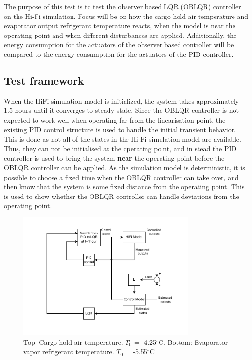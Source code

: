 The purpose of this test is to test the observer based LQR (OBLQR) controller on the Hi-Fi simulation. Focus will be on how the cargo hold air temperature and evaporator output refrigerant temperature reacts, when the model is near the operating point and when different disturbances are applied. Additionally, the energy consumption for the actuators of the observer based controller will be compared to the energy consumption for the actuators of the PID controller.

\subsection{Test framework}
When the HiFi simulation model is initialized, the system takes approximately 1.5 hours until it converges to steady state. Since the OBLQR controller is not expected to work well when operating far from the linearisation point, the existing PID control structure is used to handle the initial transient behavior. This is done as not all of the states in the Hi-Fi simulation model are available. Thus, they can not be initialised at the operating point, and in stead the PID controller is used to bring the system \textbf{near} the operating point before the OBLQR controller can be applied. 
As the simulation model is deterministic, it is possible to choose a fixed time when the OBLQR controller can take over, and then know that the system is some fixed distance from the operating point. This is used to show whether the OBLQR controller can handle deviations from the operating point.

\begin{figure}[h!]
	\centering
	\includegraphics[width=0.8\textwidth]{Graphics/HiFi_simulation_test_diagram.pdf}
	\caption{Top: Cargo hold air temperature. $T_0$ = -4.25$^{\circ}$C. Bottom: Evaporator vapor refrigerant temperature. $T_0$ = -5.55$^{\circ}$C}
	\label{fig:test_setup}
\end{figure}

